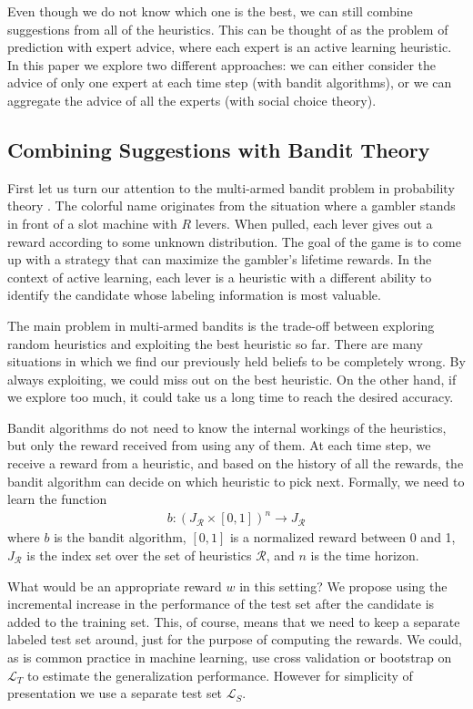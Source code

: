 \documentclass[fleqn,10pt,lineno]{wlpeerj} %
\newcommand{\X}{\mathcal{X}}
\newcommand{\Y}{\mathcal{Y}}
\newcommand{\Labeled}{\mathcal{L}}
\newcommand{\R}{\mathcal{R}}
\begin{document}
Even though we do not know which one is the best, we can still combine
suggestions from all of the heuristics. This can be thought of as the problem
of prediction with expert advice, where each expert is an active learning
heuristic. In this paper we explore two different approaches: we can either
consider the advice of only one expert at each time step (with bandit
algorithms), or we can aggregate the advice of all the experts (with social
choice theory).

\subsection{Combining Suggestions with Bandit Theory}\label{subsec:bandit}

First let us turn our attention to the multi-armed bandit problem in
probability theory \citep{berry85}. The colorful name originates from the
situation where a gambler stands in front of a slot machine with $R$ levers.
When pulled, each lever gives out a reward according to some unknown
distribution. The goal of the game is to come up with a strategy that can
maximize the gambler's lifetime rewards. In the context of active learning,
each lever is a heuristic with a different ability to identify the candidate
whose labeling information is most valuable.

The main problem in multi-armed bandits is the trade-off between exploring
random heuristics and exploiting the best heuristic so far. There are many
situations in which we find our previously held beliefs to be completely wrong.
By always exploiting, we could miss out on the best heuristic. On the other
hand, if we explore too much, it could take us a long time to reach the desired
accuracy.

Bandit algorithms do not need to know the internal workings of the heuristics,
but only the reward received from using any of them. At each time step, we
receive a reward from a heuristic, and based on the history of all the rewards,
the bandit algorithm can decide on which heuristic to pick next. Formally, we
need to learn the function
\begin{align}
	b : ({J_\R} \times [0, 1])^{n} \rightarrow J_\R
\end{align}
where $b$ is the bandit algorithm, $[0, 1]$ is a normalized reward between
0 and 1, $J_\R$ is the index set over the set of heuristics $\R$, and $n$
is the time horizon.

What would be an appropriate reward $w$ in this setting? We propose using the
incremental increase in the performance of the test set after the candidate is
added to the training set. This, of course, means that we need to keep a
separate labeled test set around, just for the purpose of computing the
rewards.
We could, as is common practice in machine learning, use cross validation or
bootstrap on $\Labeled_T$ to estimate the generalization performance. However
for simplicity of presentation we use a separate test set $\Labeled_S$.
\end{document}

